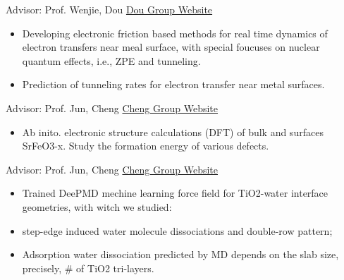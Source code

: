 
{\noindent Advisor: Prof. Wenjie, Dou  \hfill \href{https://dougroup.westlake.edu.cn/index.html}{Dou Group Website}}

\begin{itemize}
	\item Developing electronic friction based methods for real time dynamics of electron transfers near meal surface, with special foucuses on nuclear quantum effects, i.e., ZPE and tunneling.
	\item Prediction of tunneling rates for electron transfer near metal surfaces.
\end{itemize}
\vspace{5mm}


{\noindent Advisor: Prof. Jun, Cheng  \hfill \href{https://cheng-group.net}{Cheng Group Website}}

\begin{itemize}
	\item Ab inito. electronic structure calculations (DFT) of bulk and surfaces SrFeO3-x. Study the formation energy of various defects.
\end{itemize}
\vspace{5mm}



{\noindent Advisor: Prof. Jun, Cheng  \hfill \href{https://cheng-group.net}{Cheng Group Website}}


\begin{itemize}
	\item Trained DeePMD mechine learning force field for TiO2-water interface geometries, with witch we studied:
	\item \hkl[1-11] step-edge induced water molecule dissociations and double-row pattern;
	\item Adsorption water dissociation predicted by MD depends on the slab size, precisely, \# of TiO2 tri-layers.
\end{itemize}
\vspace{5mm}



